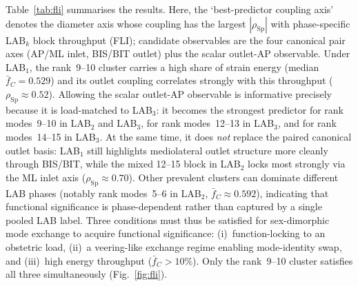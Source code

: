 \documentclass[11pt]{article}
\newcommand{\StdTableFont}{\footnotesize}
\newcommand{\StdTableInput}[1]{%
  \begingroup
  \setlength{\tabcolsep}{4pt}%
  \resizebox{\linewidth}{!}{}%
  \endgroup
}
\begin{document}
Table~\ref{tab:fli} summarises the results.
Here, the `best-predictor coupling axis' denotes the diameter axis whose coupling has the largest $|\rho_{\mathrm{Sp}}|$ with phase-specific LAB$_k$ block throughput (FLI); candidate observables are the four canonical pair axes (AP/ML inlet, BIS/BIT outlet) plus the scalar outlet-AP observable.
Under LAB$_1$, the rank~9--10 cluster carries a high share of strain energy (median $\bar f_C = 0.529$) and its outlet coupling correlates strongly with this throughput ($\rho_{\mathrm{Sp}} \approx 0.52$).
Allowing the scalar outlet-AP observable is informative precisely because it is load-matched to LAB$_3$: it becomes the strongest predictor for rank modes~9--10 in LAB$_2$ and LAB$_3$, for rank modes~12--13 in LAB$_3$, and for rank modes~14--15 in LAB$_3$.
At the same time, it does \emph{not} replace the paired canonical outlet basis: LAB$_1$ still highlights mediolateral outlet structure more cleanly through BIS/BIT, while the mixed 12--15 block in LAB$_2$ locks most strongly via the ML inlet axis ($\rho_{\mathrm{Sp}} \approx 0.70$).
Other prevalent clusters can dominate different LAB phases (notably rank modes~5--6 in LAB$_2$, $\bar f_C \approx 0.592$), indicating that functional significance is phase-dependent rather than captured by a single pooled LAB label.
Three conditions must thus be satisfied for sex-dimorphic mode exchange to acquire functional significance: (i)~function-locking to an obstetric load, (ii)~a veering-like exchange regime enabling mode-identity swap, and (iii)~high energy throughput ($\bar f_C > 10\%$).
Only the rank~9--10 cluster satisfies all three simultaneously (Fig.~\ref{fig:fli}).

\begin{table}[!tbp]
\centering
\caption{\textbf{Load--function coupling synthesis across LAB phases.}
For each of the five most prevalent clusters: veering-like/mixing regime; the best-predictor diameter coupling (chosen from AP/ML inlet, BIS/BIT outlet, and scalar OutletAP, whichever has the larger $|\rho_{\mathrm{Sp}}|$ with block energy fraction under LAB$_k$); the corresponding Spearman~$\rho_{\mathrm{Sp}}$; median block energy fraction~$\bar f_C$ for the listed LAB phase; and sex effect size on Grassmann distance~($r_{rb}$).
Stars: ${}^{***}\!p<0.001$, ${}^{**}\!p<0.01$, ${}^{*}\!p<0.05$.}
\label{tab:fli}
\StdTableFont
\StdTableInput{../../analysis_outputs/tables/function_locking_synthesis.tex}
\end{table}
\end{document}
